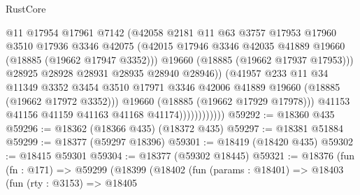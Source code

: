 \begin{lexlean}{RustCore}
\begin{coremodule}
                                  @11
                                  @17954
                                  @17961
                                  @7142
                                  (@42058
                                    @2181
                                    @11
                                    @63
                                    @3757
                                    @17953
                                    @17960
                                    @3510
                                    @17936
                                    @3346
                                    @42075
                                    (@42015
                                      @17946
                                      @3346
                                      @42035
                                      @41889
                                      @19660
                                      (@18885 (@19662 @17947 @3352)))
                                    @19660
                                    (@18885 (@19662 @17937 @17953)))
                                  @28925
                                  @28928
                                  @28931
                                  @28935
                                  @28940
                                  @28946))
                              (@41957
                                @233
                                @11
                                @34
                                @11349
                                @3352
                                @3454
                                @3510
                                @17971
                                @3346
                                @42006
                                @41889
                                @19660
                                (@18885 (@19662 @17972 @3352)))
                              @19660
                              (@18885 (@19662 @17929 @17978)))
                            @41153
                            @41156
                            @41159
                            @41163
                            @41168
                            @41174))))))))))))
@59292 := @18360 @435
@59296 := @18362 (@18366 @435) (@18372 @435)
@59297 := @18381 @51884
@59299 := @18377 (@59297 @18396)
@59301 := @18419 (@18420 @435)
@59302 := @18415 @59301
@59304 := @18377 (@59302 @18445)
@59321 := @18376
    (fun (fn : @171) =>
    @59299
      (@18399
        (@18402
          (fun (params : @18401) =>
          @18403
            (fun (rty : @3153) =>
            @18405

\end{coremodule}
\end{lexlean}
